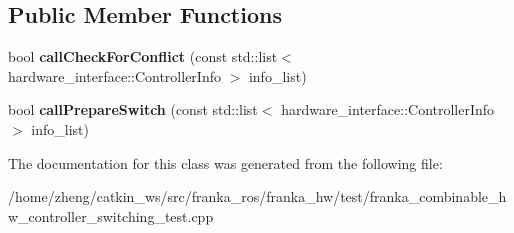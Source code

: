\subsection*{Public Member Functions}
\begin{DoxyCompactItemize}
\item 
\mbox{\label{class_combinable_no_controller_conflict_a75623ba7fc4abeb1a134a94b519323ef}} 
bool {\bfseries call\+Check\+For\+Conflict} (const std\+::list$<$ hardware\+\_\+interface\+::\+Controller\+Info $>$ info\+\_\+list)
\item 
\mbox{\label{class_combinable_no_controller_conflict_a0b7dc8012723511cc9eff4e04ba0c260}} 
bool {\bfseries call\+Prepare\+Switch} (const std\+::list$<$ hardware\+\_\+interface\+::\+Controller\+Info $>$ info\+\_\+list)
\end{DoxyCompactItemize}


The documentation for this class was generated from the following file\+:\begin{DoxyCompactItemize}
\item 
/home/zheng/catkin\+\_\+ws/src/franka\+\_\+ros/franka\+\_\+hw/test/franka\+\_\+combinable\+\_\+hw\+\_\+controller\+\_\+switching\+\_\+test.\+cpp\end{DoxyCompactItemize}
